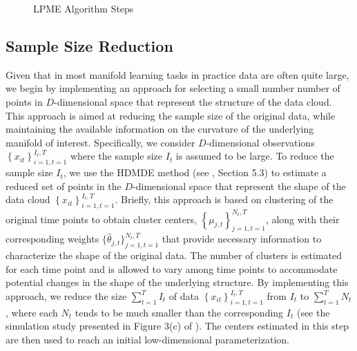 \documentclass[11pt,reqno]{article}
\theoremstyle{definition}
\begin{document}
\begin{figure}
  \hfill
  \caption{LPME Algorithm Steps}
  \label{fig:lpme_steps}
\end{figure}


\subsection*{Sample Size Reduction}

Given that in most manifold learning tasks in practice data are often quite large, we begin by implementing an approach for selecting a small number number of points in $D$-dimensional space that represent the structure of the data cloud. This approach is aimed at reducing the sample size of the original data, while maintaining the available information on the curvature of the underlying manifold of interest. Specifically, we consider $D$-dimensional observations $\left\{x_{it}\right\}_{i=1, t=1}^{I_t, T}$ where the sample size $I_t$ is assumed to be large. To reduce the sample size $I_t$, we use the HDMDE method (see \cite{mengPrincipalManifoldEstimation2021}, Section 5.3) to estimate a reduced set of points in the $D$-dimensional space that represent the shape of the data cloud $\left\{x_{it}\right\}_{i=1, t=1}^{I_t, T}$. Briefly, this approach is based on clustering of the original time points to obtain cluster centers, $\left\{\mu_{j, t}\right\}_{j=1, t=1}^{N_t, T}$, along with their corresponding weights $\{\hat{\theta}_{j, t}\}_{j=1, t=1}^{N_t, T}$ that provide necessary information to characterize the shape of the original data. The number of clusters is estimated for each time point and is allowed to vary among time points to accommodate potential changes in the shape of the underlying structure. By implementing this approach, we reduce the size $\sum_{t=1}^T I_t$ of data $\left\{x_{it}\right\}_{i=1, t=1}^{I_t, T}$ from $I_t$ to $\sum_{t=1}^T N_t$, where each $N_t$ tends to be much smaller than the corresponding $I_t$ (see the simulation study presented in Figure 3(c) of \cite{mengPrincipalManifoldEstimation2021}). The centers estimated in this step are then used to reach an initial low-dimensional parameterization.
\end{document}
